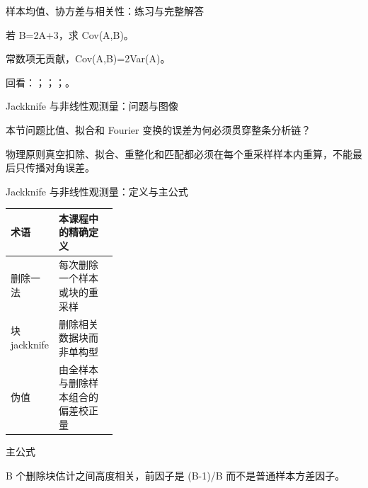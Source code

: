\begin{frame}[t]{样本均值、协方差与相关性：练习与完整解答}
\footnotesize
\begin{block}{}若 B=2A+3，求 Cov(A,B)。\end{block}
\begin{exampleblock}{}常数项无贡献，Cov(A,B)=2Var(A)。\end{exampleblock}
\vfill
\scriptsize 回看：；；；。
\end{frame}

\begin{frame}[t]{Jackknife 与非线性观测量：问题与图像}
\footnotesize
\begin{block}{本节问题}比值、拟合和 Fourier 变换的误差为何必须贯穿整条分析链？\end{block}
\begin{block}{物理原则}\quad 真空扣除、拟合、重整化和匹配都必须在每个重采样样本内重算，不能最后只传播对角误差。\end{block}
\end{frame}

\begin{frame}[t]{Jackknife 与非线性观测量：定义与主公式}
\footnotesize\begin{tabularx}{\linewidth}{p{0.30\linewidth}Y}
\toprule 术语 & 本课程中的精确定义\\\midrule
{} 删除一法 & 每次删除一个样本或块的重采样\\
 块 jackknife & 删除相关数据块而非单构型\\
 伪值 & 由全样本与删除样本组合的偏差校正量\\
\bottomrule\end{tabularx}\vspace{0.15cm}
\begin{block}{ 主公式}\centering{}\end{block}
B 个删除块估计之间高度相关，前因子是 (B-1)/\allowbreak{}B 而不是普通样本方差因子。
\end{frame}

